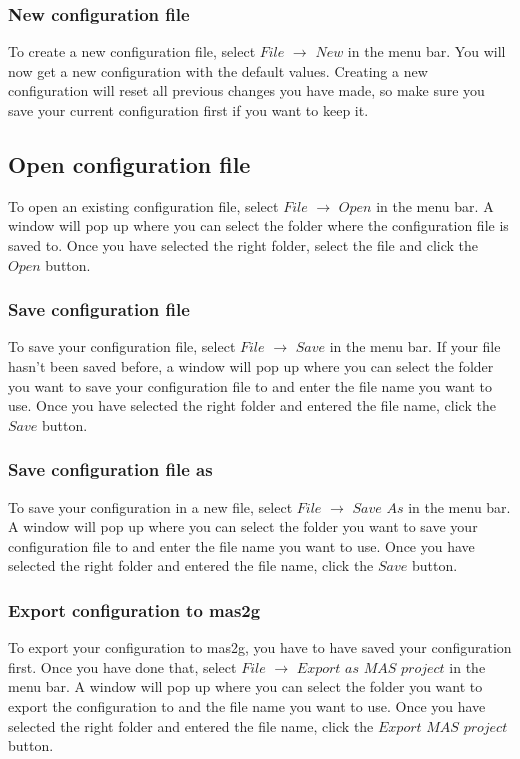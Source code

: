 \documentclass[11pt,a4paper]{article}
\begin{document}
\subsubsection{New configuration file}
To create a new configuration file, select $File$ $\to$ $New$ in the menu bar. You will now get a new configuration with the default values. Creating a new configuration will reset all previous changes you have made, so make sure you save your current configuration first if you want to keep it.

\subsection{Open configuration file}
To open an existing configuration file, select $File$ $\to$ $Open$ in the menu bar. A window will pop up where you can select the folder where the configuration file is saved to. Once you have selected the right folder, select the file and click the $Open$ button.

\subsubsection{Save configuration file}
To save your configuration file, select $File$ $\to$ $Save$ in the menu bar. If your file hasn't been saved before, a window will pop up where you can select the folder you want to save your configuration file to and enter the file name you want to use. Once you have selected the right folder and entered the file name, click the $Save$ button.

\subsubsection{Save configuration file as}
To save your configuration in a new file, select $File$ $\to$ $Save$ $As$ in the menu bar. A window will pop up where you can select the folder you want to save your configuration file to and enter the file name you want to use. Once you have selected the right folder and entered the file name, click the $Save$ button.

\subsubsection{Export configuration to mas2g}
To export your configuration to mas2g, you have to have saved your configuration first. Once you have done that, select $File$ $\to$ $Export$ $as$ $MAS$ $project$ in the menu bar. A window will pop up where you can select the folder you want to export the configuration to and the file name you want to use. Once you have selected the right folder and entered the file name, click the $Export$ $MAS$ $project$ button.
\end{document}
